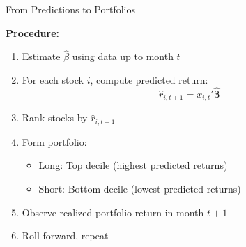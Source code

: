 \documentclass[10pt]{beamer}
\begin{document}




\begin{frame}{From Predictions to Portfolios}

\textbf{Procedure:}
\begin{enumerate}
  \item Estimate $\widehat{\beta}$ using data up to month $t$
  
  \vspace{0.3em}
  \item For each stock $i$, compute predicted return:
  \[
  \widehat{r}_{i,t+1} = x_{i,t}'\widehat{\boldsymbol{\beta}}
  \]
  
  \vspace{0.3em}
  \item Rank stocks by $\widehat{r}_{i,t+1}$
  
  \vspace{0.3em}
  \item Form portfolio:
  \begin{itemize}
    \item Long: Top decile (highest predicted returns)
    \item Short: Bottom decile (lowest predicted returns)
  \end{itemize}
  
  \vspace{0.3em}
  \item Observe realized portfolio return in month $t+1$
  
  \vspace{0.3em}
  \item Roll forward, repeat
\end{enumerate}

\end{frame}

\end{document}
